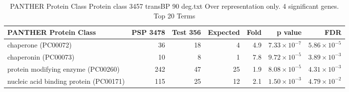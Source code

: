 \begin{table}[ht]
\centering
\begin{adjustbox}{width=\textwidth}
\begin{tabular}{lrrrrrr}
  \hline
PANTHER Protein Class & PSP 3478 & Test 356 & Expected & Fold & p value & FDR \\ 
  \hline
chaperone (PC00072) & 36 & 18 & 4 & 4.9 & $7.33 \times 10^{-7}$ & $5.86 \times 10^{-5}$ \\ 
  chaperonin (PC00073) & 10 & 8 & 1 & 7.8 & $9.72 \times 10^{-5}$ & $3.89 \times 10^{-3}$ \\ 
  protein modifying enzyme (PC00260) & 242 & 47 & 25 & 1.9 & $8.08 \times 10^{-5}$ & $4.31 \times 10^{-3}$ \\ 
  nucleic acid binding protein (PC00171) & 115 & 25 & 12 & 2.1 & $1.50 \times 10^{-3}$ & $4.79 \times 10^{-2}$ \\ 
   \hline
\end{tabular}
\end{adjustbox}
\caption{PANTHER Protein Class Protein class 3457 transBP 90 deg.txt Over representation only. 4 significant genes. Top 20 Terms} 
\label{tab:PANTHER Protein Class Protein class 3457 transBP 90 deg.txt Over representation only. 4 significant genes. Top 20 Terms}
\end{table}










